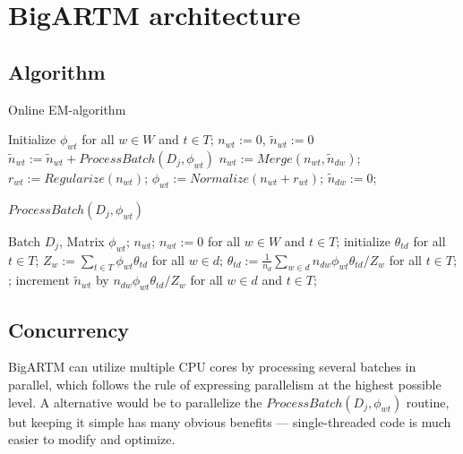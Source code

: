 \documentclass{llncs}
\begin{document}
\cite{hoffman10online}

\cite{zhang13sparse}

\section{BigARTM architecture}
\label{sec:BigARTM}

\subsection{Algorithm}

\begin{algorithm}
\caption{Online EM-algorithm}
\label{fig:plsa_alg}
\begin{algorithmic}[1]
\STATE Initialize $\phi_{wt}$ for all $w \in W$ and $t \in T$;
\STATE $n_{wt} := 0$, $\tilde n_{wt} := 0$
    \STATE $\tilde n_{wt} := \tilde n_{wt} + ProcessBatch(D_j, \phi_{wt})$
        \STATE $n_{wt} := Merge(n_{wt}, \tilde n_{dw})$;
        \STATE $r_{wt} := Regularize(n_{wt})$;
        \STATE $\phi_{wt} := Normalize(n_{wt} + r_{wt})$;
        \STATE $\tilde n_{dw} := 0$;
    \ENDIF
\ENDFOR
\end{algorithmic}
\end{algorithm}

\begin{algorithm}
\caption{$ProcessBatch(D_j, \phi_{wt})$}
\label{fig:plsa_alg}
\begin{algorithmic}[1]
\REQUIRE Batch $D_j$, Matrix $\phi_{wt}$;
\ENSURE $n_{wt}$;
\STATE $n_{wt} := 0$ for all $w \in W$ and $t \in T$;
	\STATE initialize $\theta_{td}$ for all $t \in T$;
	\REPEAT
		\STATE $Z_w := \sum_{t \in T} \phi_{wt} \theta_{td}$ for all $w \in d$;
		\STATE $\theta_{td} := \frac{1}{n_d} \sum_{w \in d} n_{dw} \phi_{wt} \theta_{td} / Z_w$
               for all $t \in T$;
	;
	\STATE increment $\tilde n_{wt}$ by $n_{dw} \phi_{wt} \theta_{td} / Z_w$
           for all $w \in d$ and $t \in T$;
\ENDFOR
\end{algorithmic}
\end{algorithm}

\subsection{Concurrency}
BigARTM can utilize multiple CPU cores by processing several batches in parallel,
which follows the rule of expressing parallelism at the highest possible level.
A alternative would be to parallelize the $ProcessBatch(D_j, \phi_{wt})$ routine,
but keeping it simple has many obvious benefits --- single-threaded code is much easier to modify and optimize.
\end{document}
